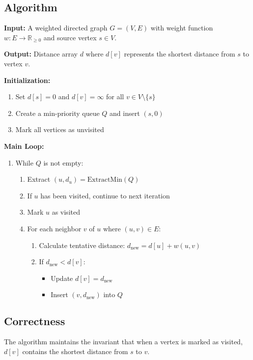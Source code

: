 \documentclass{article}
\begin{document}
\subsection{Algorithm}
\textbf{Input:} A weighted directed graph $G = (V, E)$ with weight function $w: E \to \mathbb{R}_{\geq 0}$ and source vertex $s \in V$.

\textbf{Output:} Distance array $d$ where $d[v]$ represents the shortest distance from $s$ to vertex $v$.

\textbf{Initialization:}
\begin{enumerate}
    \item Set $d[s] = 0$ and $d[v] = \infty$ for all $v \in V \setminus \{s\}$
    \item Create a min-priority queue $Q$ and insert $(s, 0)$
    \item Mark all vertices as unvisited
\end{enumerate}

\textbf{Main Loop:}
\begin{enumerate}
    \item While $Q$ is not empty:
    \begin{enumerate}
        \item Extract $(u, d_u) = \text{ExtractMin}(Q)$
        \item If $u$ has been visited, continue to next iteration
        \item Mark $u$ as visited
        \item For each neighbor $v$ of $u$ where $(u,v) \in E$:
        \begin{enumerate}
            \item Calculate tentative distance: $d_{\text{new}} = d[u] + w(u,v)$
            \item If $d_{\text{new}} < d[v]$:
            \begin{itemize}
                \item Update $d[v] = d_{\text{new}}$
                \item Insert $(v, d_{\text{new}})$ into $Q$
            \end{itemize}
        \end{enumerate}
    \end{enumerate}
\end{enumerate}

\subsection{Correctness}
The algorithm maintains the invariant that when a vertex is marked as visited, $d[v]$ contains the shortest distance from $s$ to $v$.
\end{document}
